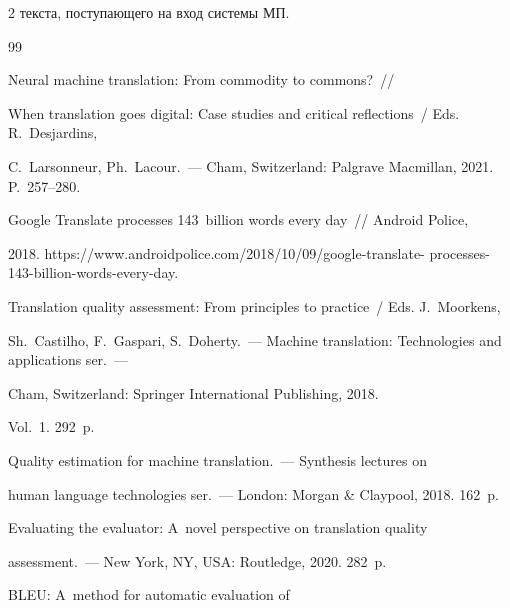 \begin{multicols}{2}
текста, поступающего на вход системы МП.


  


{\small\frenchspacing


{%




\begin{thebibliography}{99}




 Neural machine translation: From commodity to commons?~//


 When  translation goes digital: Case studies and critical reflections~/ Eds. R.~Desjardins, 


C.~Larsonneur, Ph.~Lacour.~--- Cham, Switzerland: Palgrave Macmillan, 2021. P.~257--280.




 Google Translate processes 143~billion words every day~// Android Police, 


2018. {\sf https://\linebreak www.androidpolice.com/2018/10/09/google-translate- processes-143-billion-words-every-day}.




Translation quality assessment: From principles to practice~/ Eds. J.~Moorkens, 


Sh.~Castilho, F.~Gaspari, S.~Doherty.~--- Machine translation: Technologies and applications ser.~---


Cham, Switzerland: Springer International Publishing,  2018. 


Vol.~1. 292~p.




 Quality estimation for machine translation.~--- Synthesis lectures on


human language technologies ser.~--- London: Morgan \& Claypool, 2018. 162~p.




 Evaluating the evaluator: A~novel perspective on translation quality 


assessment.~--- New York, NY, USA: Routledge, 2020. 282~p.




 BLEU: A~method for automatic evaluation of 



\end{thebibliography}}}
\end{multicols}
